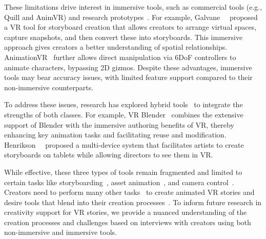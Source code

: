 These limitations drive interest in immersive tools, such as commercial tools (e.g., Quill and AnimVR) and research prototypes~\cite{galvane2019vr, stemasov2023sampling, wang2022videoposevr, nguyen2017collavr, vogel2018animationvr}. 
For example, Galvane~\etal~\cite{galvane2019vr} proposed a VR tool for storyboard creation that allows creators to arrange virtual spaces, capture snapshots, and then convert these into storyboards. This immersive approach gives creators a better understanding of spatial relationships.
AnimationVR~\cite{vogel2018animationvr} further allows direct manipulation via 6DoF controllers to animate characters, bypassing 2D gizmos.
Despite these advantages, immersive tools may bear accuracy issues, with limited feature support compared to their non-immersive counterparts.

To address these issues, research has explored hybrid tools~\cite{henrikson2016multi, lamberti2020immersive} to integrate the strengths of both classes. 
For example, VR Blender~\cite{lamberti2020immersive} combines the extensive support of Blender with the immersive authoring benefits of VR, thereby enhancing key animation tasks and facilitating reuse and modification. 
Henrikson~\etal~\cite{henrikson2016multi} proposed a multi-device system that facilitates artists to create storyboards on tablets while allowing directors to see them in VR.

While effective, these three types of tools remain fragmented and limited to certain tasks like storyboarding~\cite{henrikson2016multi, henrikson2016storeoboard, galvane2019vr}, asset animation~\cite{lamberti2020immersive, vogel2018animationvr, wang2022videoposevr}, and camera control~\cite{galvane2019vr}. 
Creators need to perform many other tasks~\cite{gipson2018disneycicles} to create animated VR stories and desire tools that blend into their creation processes~\cite{cutler2019making}.
To inform future research in creativity support for VR stories, we provide a nuanced understanding of the creation processes and challenges based on interviews with creators using both non-immersive and immersive tools.
